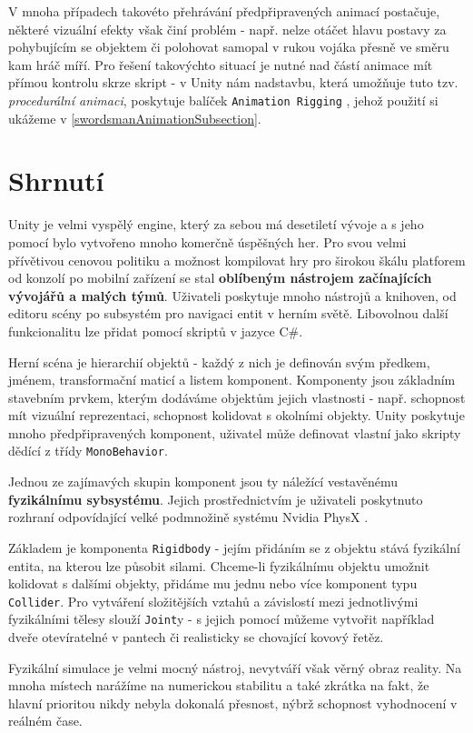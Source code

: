 V mnoha případech takovéto přehrávání předpřipravených animací postačuje, některé vizuální efekty však činí problém - např. nelze otáčet hlavu postavy za pohybujícím se objektem či polohovat samopal v rukou vojáka přesně ve směru kam hráč míří. Pro řešení takovýchto situací je nutné nad částí animace mít přímou kontrolu skrze skript - v Unity nám nadstavbu, která umožňuje tuto tzv. \textit{procedurální animaci}, poskytuje balíček \texttt{Animation Rigging} \cite{AnimationRigging}, jehož použití si ukážeme v \ref{swordsmanAnimationSubsection}.

\pagebreak

\section{Shrnutí}

Unity je velmi vyspělý engine, který za sebou má desetiletí vývoje a s jeho pomocí bylo vytvořeno mnoho komerčně úspěšných her. Pro svou velmi přívětivou cenovou politiku a možnost kompilovat hry pro širokou škálu platforem od konzolí po mobilní zařízení se stal \textbf{oblíbeným nástrojem začínajících vývojářů a malých týmů}. Uživateli poskytuje mnoho nástrojů a knihoven, od editoru scény po subsystém pro navigaci entit v herním světě. Libovolnou další funkcionalitu lze přidat pomocí skriptů v jazyce C\#. 

Herní scéna je hierarchií objektů - každý z nich je definován svým předkem, jménem, transformační maticí a listem komponent. Komponenty jsou základním stavebním prvkem, kterým dodáváme objektům jejich vlastnosti - např. schopnost mít vizuální reprezentaci, schopnost kolidovat s okolními objekty. Unity poskytuje mnoho předpřipravených komponent, uživatel může definovat vlastní jako skripty dědící z třídy \texttt{MonoBehavior}.

Jednou ze zajímavých skupin komponent jsou ty náležící vestavěnému \textbf{fyzikálnímu sybsystému}. Jejich prostřednictvím je uživateli poskytnuto rozhraní odpovídající velké podmnožině systému Nvidia PhysX \cite{PhysX}. 

Základem je komponenta \texttt{Rigidbody} - jejím přidáním se z objektu stává fyzikální entita, na kterou lze působit silami. Chceme-li fyzikálnímu objektu umožnit kolidovat s dalšími objekty, přidáme mu jednu nebo více komponent typu \texttt{Collider}. Pro vytváření složitějších vztahů a závislostí mezi jednotlivými fyzikálními tělesy slouží \texttt{Joint}y - s jejich pomocí můžeme vytvořit například dveře otevíratelné v pantech či realisticky se chovající kovový řetěz.

Fyzikální simulace je velmi mocný nástroj, nevytváří však věrný obraz reality. Na mnoha místech narážíme na numerickou stabilitu a také zkrátka na fakt, že hlavní prioritou nikdy nebyla dokonalá přesnost, nýbrž schopnost vyhodnocení v reálném čase.
